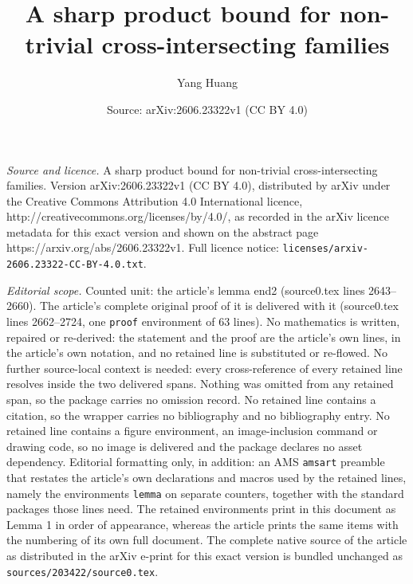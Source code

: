 \documentclass[10pt,a4paper]{amsart}
\title{A sharp product bound for non-trivial cross-intersecting families}
\author{Yang Huang}
\date{Source: arXiv:2606.23322v1 (CC BY 4.0)}
\begin{document}
\maketitle

\noindent\emph{Source and licence.} A sharp product bound for non-trivial cross-intersecting families. Version arXiv:2606.23322v1 (CC BY 4.0), distributed by arXiv under the Creative Commons Attribution 4.0 International licence, http://creativecommons.org/licenses/by/4.0/, as recorded in the arXiv licence metadata for this exact version and shown on the abstract page https://arxiv.org/abs/2606.23322v1. Full licence notice: \texttt{licenses/arxiv-2606.23322-CC-BY-4.0.txt}.\par\smallskip

\noindent\textit{Editorial scope.} Counted unit: the article's lemma end2 (source0.tex lines 2643--2660). The article's complete original proof of it is delivered with it (source0.tex lines 2662--2724, one \texttt{proof} environment of 63 lines). No mathematics is written, repaired or re-derived: the statement and the proof are the article's own lines, in the article's own notation, and no retained line is substituted or re-flowed.  No further source-local context is needed: every cross-reference of every retained line resolves inside the two delivered spans.  Nothing was omitted from any retained span, so the package carries no omission record.  No retained line contains a citation, so the wrapper carries no bibliography and no bibliography entry.  No retained line contains a figure environment, an image-inclusion command or drawing code, so no image is delivered and the package declares no asset dependency.  Editorial formatting only, in addition: an AMS \texttt{amsart} preamble that restates the article's own declarations and macros used by the retained lines, namely the environments \texttt{lemma} on separate counters, together with the standard packages those lines need.  The retained environments print in this document as Lemma 1 in order of appearance, whereas the article prints the same items with the numbering of its own full document.  The complete native source of the article as distributed in the arXiv e-print for this exact version is bundled unchanged as \texttt{sources/203422/source0.tex}.
\end{document}
